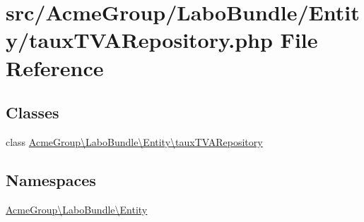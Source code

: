 \hypertarget{taux_t_v_a_repository_8php}{\section{src/\+Acme\+Group/\+Labo\+Bundle/\+Entity/taux\+T\+V\+A\+Repository.php File Reference}
\label{taux_t_v_a_repository_8php}
}
\subsection*{Classes}
\begin{DoxyCompactItemize}
\item 
class \hyperlink{class_acme_group_1_1_labo_bundle_1_1_entity_1_1taux_t_v_a_repository}{Acme\+Group\textbackslash{}\+Labo\+Bundle\textbackslash{}\+Entity\textbackslash{}taux\+T\+V\+A\+Repository}
\end{DoxyCompactItemize}
\subsection*{Namespaces}
\begin{DoxyCompactItemize}
\item 
 \hyperlink{namespace_acme_group_1_1_labo_bundle_1_1_entity}{Acme\+Group\textbackslash{}\+Labo\+Bundle\textbackslash{}\+Entity}
\end{DoxyCompactItemize}
